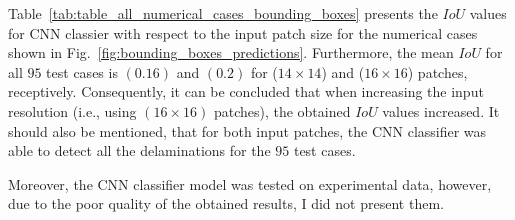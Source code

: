Table~\ref{tab:table_all_numerical_cases_bounding_boxes} presents the \(IoU\) values for CNN classier with respect to the input patch size for the numerical cases shown in Fig.~\ref{fig:bounding_boxes_predictions}.
Furthermore, the mean \(IoU\) for all \(95\) test cases is \((0.16)\) and \((0.2)\) for (\(14\times14\)) and (\(16\times16\)) patches, receptively.
Consequently, it can be concluded that when increasing the input resolution (i.e., using \((16\times16)\) patches), the obtained \(IoU\) values increased.
It should also be mentioned, that for both input patches, the CNN classifier was able to detect all the delaminations for the \(95\) test cases.

Moreover, the CNN classifier model was tested on experimental data, however, due to the poor quality of the obtained results, I did not present them.

